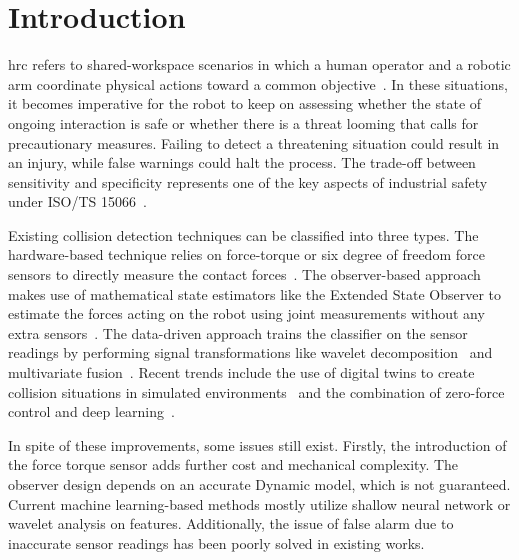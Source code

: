\documentclass[3p,times,procedia]{elsarticle}
\begin{document}
\newpage

\section{Introduction}
\label{sec:introduction}

\Ac{hrc} refers to shared-workspace scenarios in which a human operator and a robotic arm coordinate physical actions toward a common objective~\cite{selvaggio2021autonomy}. In these situations, it becomes imperative for the robot to keep on assessing whether the state of ongoing interaction is safe or whether there is a threat looming that calls for precautionary measures. Failing to detect a threatening situation could result in an injury, while false warnings could halt the process. The trade-off between sensitivity and specificity represents one of the key aspects of industrial safety under ISO/TS 15066~\cite{iso15066}.

Existing collision detection techniques can be classified into three types. The hardware-based technique relies on force-torque or six degree of freedom force sensors to directly measure the contact forces~\cite{wang2025sixdof}. The observer-based approach makes use of mathematical state estimators like the Extended State Observer to estimate the forces acting on the robot using joint measurements without any extra sensors~\cite{tonti2024eso}. The data-driven approach trains the classifier on the sensor readings by performing signal transformations like wavelet decomposition~\cite{niu2024wavelet} and multivariate fusion~\cite{fang2024multivariate}. Recent trends include the use of digital twins to create collision situations in simulated environments~\cite{an2024digitaltwin} and the combination of zero-force control and deep learning~\cite{zhao2025zeroforce}.

In spite of these improvements, some issues still exist. Firstly, the introduction of the force torque sensor adds further cost and mechanical complexity. The observer design depends on an accurate Dynamic model, which is not guaranteed. Current machine learning-based methods mostly utilize shallow neural network or wavelet analysis on features. Additionally, the issue of false alarm due to inaccurate sensor readings has been poorly solved in existing works.
\end{document}
